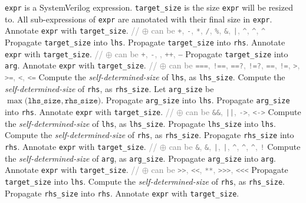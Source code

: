 \documentclass{article}
\newcommand{\tild}{\raisebox{-.7ex}{\textasciitilde{}}}
\newcommand{\sds}{\emph{self-determined-size}}
\newcommand{\binOp}{\texttt{+}, \texttt{-}, \texttt{*}, \texttt{/}, \texttt{\%},
\texttt{\&}, \texttt{|}, \texttt{\^{}}, \texttt{\^{}\tild},
\texttt{\tild\^{}}}
\newcommand{\unOp}{\texttt{+}, \texttt{-}, \texttt{\tild}, \texttt{++},
  \texttt{--}}
\newcommand{\shiftOp}{\texttt{>>}, \texttt{<}\texttt{<}, \texttt{**},
  \texttt{>>>}, \texttt{<}\texttt{<}\texttt{<}}
\newcommand{\compOp}{\texttt{===}, \texttt{!==}, \texttt{==?}, \texttt{!=?},
  \texttt{==}, \texttt{!=}, \texttt{>}, \texttt{>=}, \texttt{<}, \texttt{<=}}
\newcommand{\logicOp}{\texttt{\&\&}, \texttt{||}, \texttt{->}, \texttt{<->}}
\newcommand{\redOp}{\texttt{\&}, \texttt{\tild\&}, \texttt{|}, \texttt{\tild|},
\texttt{\^{}}, \texttt{\tild\^{}}, \texttt{\^{}\tild}, \texttt{!}}
\renewcommand{\Comment}[1]{\State \textcolor{gray}{// #1}}
\begin{document}
\begin{algorithm}
  \caption{Resize an expression, propagating the size.}
  \label{alg:propagate}
  \begin{algorithmic}[1]
    \Require \texttt{expr} is a SystemVerilog expression. \texttt{target\_size} is the size \texttt{expr} will be resized to.
    \Ensure All sub-expressions of \texttt{expr} are annotated with their final size in \texttt{expr}.
    \State Annotate \texttt{expr} with \texttt{target\_size}.
    \ENDWHEN
    \Comment{$\oplus$ can be \binOp{}}
    \State Propagate \texttt{target\_size} into \texttt{lhs}.
    \State Propagate \texttt{target\_size} into \texttt{rhs}.
    \State Annotate \texttt{expr} with \texttt{target\_size}.
    \ENDWHEN
    \Comment{$\oplus$ can be \unOp{}}
    \State Propagate \texttt{target\_size} into \texttt{arg}.
    \State Annotate \texttt{expr} with \texttt{target\_size}.
    \ENDWHEN
    \Comment{$\oplus$ can be \compOp{}}
    \State Compute the \sds{} of \texttt{lhs}, as \texttt{lhs\_size}.
    \State Compute the \sds{} of \texttt{rhs}, as \texttt{rhs\_size}.
    \State Let \texttt{arg\_size} be $\max\big(\texttt{lhs\_size}, \texttt{rhs\_size}\big)$.
    \State Propagate \texttt{arg\_size} into \texttt{lhs}.
    \State Propagate \texttt{arg\_size} into \texttt{rhs}.
    \State Annotate \texttt{expr} with \texttt{target\_size}.
    \ENDWHEN
    \Comment{$\oplus$ can be \logicOp{}}
    \State Compute the \sds{} of \texttt{lhs}, as \texttt{lhs\_size}.
    \State Propagate \texttt{lhs\_size} into \texttt{lhs}.
    \State Compute the \sds{} of \texttt{rhs}, as \texttt{rhs\_size}.
    \State Propagate \texttt{rhs\_size} into \texttt{rhs}.
    \State Annotate \texttt{expr} with \texttt{target\_size}.
    \ENDWHEN
    \Comment{$\oplus$ can be \redOp{}}
    \State Compute the \sds{} of \texttt{arg}, as \texttt{arg\_size}.
    \State Propagate \texttt{arg\_size} into \texttt{arg}.
    \State Annotate \texttt{expr} with \texttt{target\_size}.
    \ENDWHEN
    \Comment{$\oplus$ can be \shiftOp{}}
    \State Propagate \texttt{target\_size} into \texttt{lhs}.
    \State Compute the \sds{} of \texttt{rhs}, as \texttt{rhs\_size}.
    \State Propagate \texttt{rhs\_size} into \texttt{rhs}.
    \State Annotate \texttt{expr} with \texttt{target\_size}.
    \ENDWHEN
  \end{algorithmic}
\end{algorithm}
\end{document}
